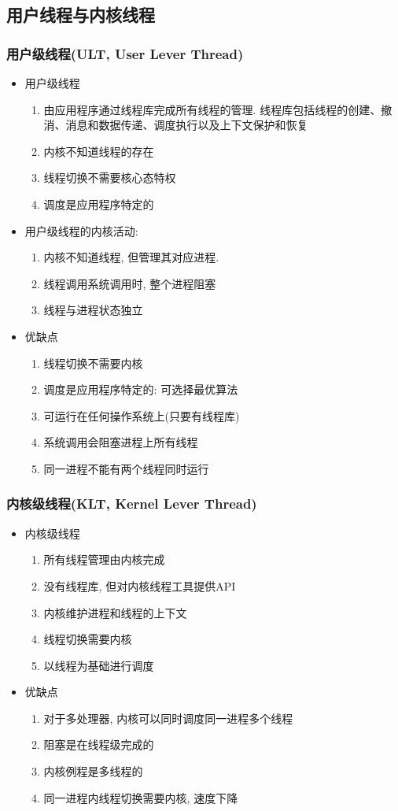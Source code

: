 \documentclass[a4paper, UTF8]{article}
\begin{document}
\subsection{用户线程与内核线程}
\subsubsection{用户级线程(ULT, User Lever Thread)}
\begin{itemize}
\item 用户级线程
	\begin{enumerate}
	\item 由应用程序通过线程库完成所有线程的管理. 线程库包括线程的创建、撤消、消息和数据传递、调度执行以及上下文保护和恢复
	\item 内核不知道线程的存在
	\item 线程切换不需要核心态特权
	\item 调度是应用程序特定的
	\end{enumerate}
\item 用户级线程的内核活动:
	\begin{enumerate}
	\item 内核不知道线程, 但管理其对应进程.
	\item 线程调用系统调用时, 整个进程阻塞
	\item 线程与进程状态独立
	\end{enumerate}
\item 优缺点
	\begin{enumerate}
	\item 线程切换不需要内核
	\item 调度是应用程序特定的: 可选择最优算法
	\item 可运行在任何操作系统上(只要有线程库)
	\item 系统调用会阻塞进程上所有线程
	\item 同一进程不能有两个线程同时运行
	\end{enumerate}
\end{itemize}
\subsubsection{内核级线程(KLT, Kernel Lever Thread)}
\begin{itemize}
\item 内核级线程
	\begin{enumerate}
	\item 所有线程管理由内核完成
	\item 没有线程库, 但对内核线程工具提供API
	\item 内核维护进程和线程的上下文
	\item 线程切换需要内核
	\item 以线程为基础进行调度
	\end{enumerate}
\item 优缺点
	\begin{enumerate}
	\item 对于多处理器, 内核可以同时调度同一进程多个线程
	\item 阻塞是在线程级完成的
	\item 内核例程是多线程的
	\item 同一进程内线程切换需要内核, 速度下降
	\end{enumerate}
\end{itemize}
\end{document}
